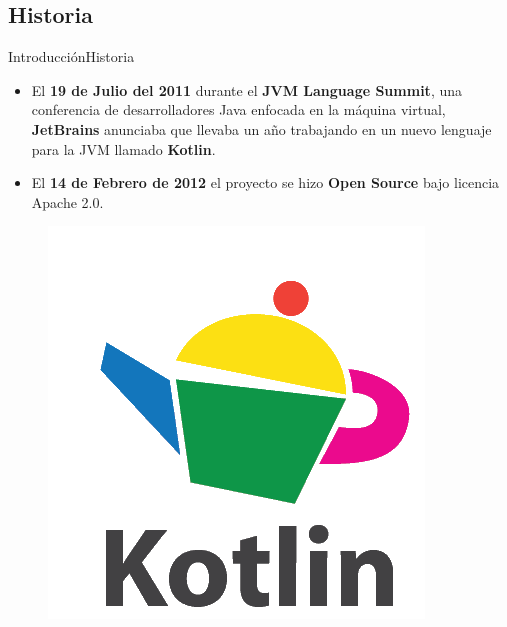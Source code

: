 \subsection{Historia}
\begin{frame}{Introducción}{Historia}
 \begin{itemize}
  \item<1-> El \textbf{19 de Julio del 2011} durante el \textbf{JVM Language Summit}, una conferencia de desarrolladores Java enfocada en la máquina virtual,
  \textbf{JetBrains} anunciaba que llevaba un año trabajando en un nuevo lenguaje para la JVM llamado \textbf{Kotlin}.
  \item<2-> El \textbf{14 de Febrero de 2012} el proyecto se hizo \textbf{Open Source} bajo licencia Apache 2.0.
 \end{itemize}
 \begin{figure}[!htb]
  \endminipage
  \includegraphics[width=\linewidth]{images/introduction/kotlin_logo_0}
  \endminipage
  \endminipage
 \end{figure}
\end{frame}
